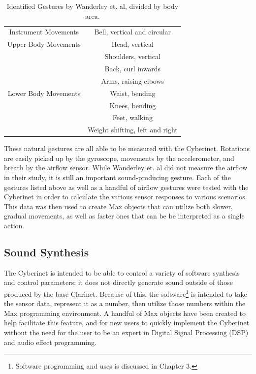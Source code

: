 \begin{table}[]
    \centering
    \begin{tabular}{|c||c|}
    \hline
       Instrument Movements  & Bell, vertical and circular \\
        Upper Body Movements & Head, vertical \\
        & Shoulders, vertical \\
        & Back, curl inwards \\
        & Arms, raising elbows \\
        Lower Body Movements & Waist, bending \\
        & Knees, bending \\
        & Feet, walking \\
        & Weight shifting, left and right\\
        \hline
    \end{tabular}
    \caption{Identified Gestures by Wanderley et. al\cite{wanderleyClarinetGesture2005}, divided by body area.}
    \label{tab:generalGestures}
\end{table}

These natural gestures are all able to be measured with the Cyberinet. Rotations are easily picked up by the gyroscope, movements by the accelerometer, and breath by the airflow sensor. While Wanderley et. al did not measure the airflow in their study, it is still an important sound-producing gesture\cite{miranda_Wanderley_instrumentControl_2006}. Each of the gestures listed above as well as a handful of airflow gestures were tested with the Cyberinet in order to calculate the various sensor responses to various scenarios. This data was then used to create Max objects that can utilize both slower, gradual movements, as well as faster ones that can be be interpreted as a single action.

\subsection{Sound Synthesis} %

The Cyberinet is intended to be able to control a variety of software synthesis and control parameters; it does not directly generate sound outside of those produced by the base Clarinet. Because of this, the software\footnote{Software programming and uses is discussed in Chapter 3.} is intended to take the sensor data, represent it as a number, then utilize those numbers within the Max programming environment. A handful of Max objects have been created to help facilitate this feature, and for new users to quickly implement the Cyberinet without the need for the user to be an expert in Digital Signal Processing (DSP) and audio effect programming.

